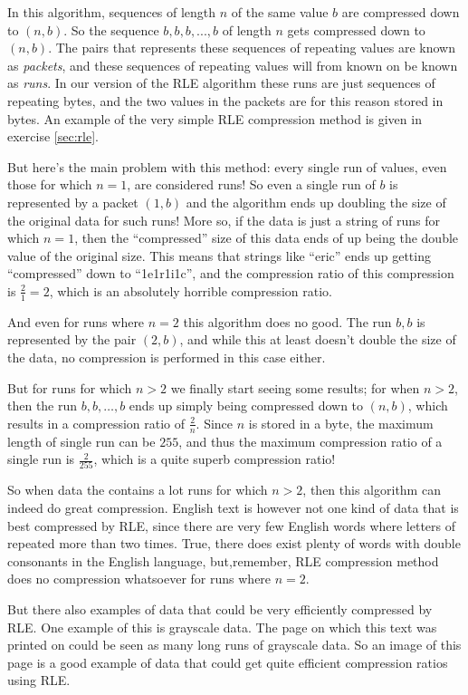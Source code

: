 In this algorithm, sequences of length $n$ of the same value $b$ are
compressed down to $(n,b)$. So the sequence $b,b,b,...,b$ of length
$n$ gets compressed down to $(n,b)$. The pairs that represents these
sequences of repeating values are known as \textit{packets}, and these
sequences of repeating values will from known on be known as
\textit{runs}. In our version of the RLE algorithm these runs are just
sequences of repeating bytes, and the two values in the packets are
for this reason stored in bytes. An example of the very simple RLE
compression method is given in exercise \ref{sec:rle}.

But here's the main problem with this method: every single run of
values, even those for which $n=1$, are considered runs! So even a
single run of $b$ is represented by a packet $(1,b)$ and the algorithm
ends up doubling the size of the original data for such runs! More so,
if the data is just a string of runs for which $n=1$, then the
``compressed'' size of this data ends of up being the double value of
the original size. This means that strings like ``eric'' ends up
getting ``compressed'' down to ``1e1r1i1c'', and the compression ratio
of this compression is $\frac{2}{1} = 2$, which is an absolutely
horrible compression ratio.

And even for runs where $n=2$ this algorithm does no good. The run
$b,b$ is represented by the pair $(2,b)$, and while this at least
doesn't double the size of the data, no compression is performed in
this case either.

But for runs for which $n > 2$ we finally start seeing some results;
for when $n > 2$, then the run $b, b, \dots, b$ ends up simply being
compressed down to $(n,b)$, which results in a compression ratio of
$\frac{2}{n}$. Since $n$ is stored in a byte, the maximum
length of single run can be $255$, and thus the maximum compression
ratio of a single run is $\frac{2}{255}$, which is a quite superb
compression ratio!

So when data the contains a lot runs for which $n > 2$, then this
algorithm can indeed do great compression. English text is however not
one kind of data that is best compressed by RLE, since there are very
few English words where letters of repeated more than two times. True,
there does exist plenty of words with double consonants in the English
language, but,remember, RLE compression method does no compression
whatsoever for runs where $n=2$.

But there also examples of data that could be very efficiently
compressed by RLE. One example of this is grayscale data. The page on
which this text was printed on could be seen as many long runs of
grayscale data. So an image of this page is a good example of data
that could get quite efficient compression ratios using RLE.

